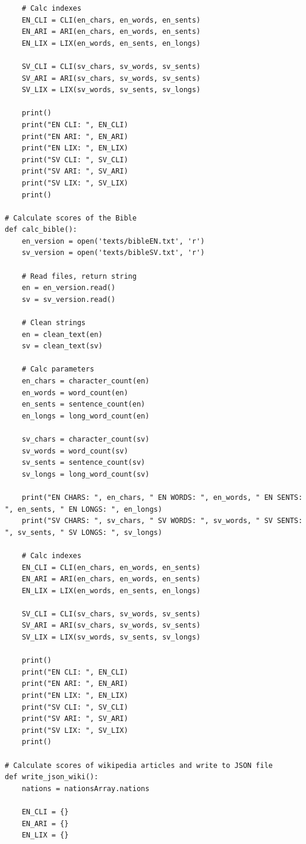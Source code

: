 \documentclass[a4paper]{article}
\begin{document}
\begin{verbatim}
    # Calc indexes
    EN_CLI = CLI(en_chars, en_words, en_sents)
    EN_ARI = ARI(en_chars, en_words, en_sents)
    EN_LIX = LIX(en_words, en_sents, en_longs)

    SV_CLI = CLI(sv_chars, sv_words, sv_sents)
    SV_ARI = ARI(sv_chars, sv_words, sv_sents)
    SV_LIX = LIX(sv_words, sv_sents, sv_longs)   
    
    print()
    print("EN CLI: ", EN_CLI)
    print("EN ARI: ", EN_ARI)
    print("EN LIX: ", EN_LIX)
    print("SV CLI: ", SV_CLI)
    print("SV ARI: ", SV_ARI)
    print("SV LIX: ", SV_LIX)
    print()

# Calculate scores of the Bible
def calc_bible():
    en_version = open('texts/bibleEN.txt', 'r')
    sv_version = open('texts/bibleSV.txt', 'r')
    
    # Read files, return string
    en = en_version.read()
    sv = sv_version.read()
    
    # Clean strings
    en = clean_text(en)
    sv = clean_text(sv)
    
    # Calc parameters
    en_chars = character_count(en)
    en_words = word_count(en)
    en_sents = sentence_count(en)
    en_longs = long_word_count(en)
        
    sv_chars = character_count(sv)
    sv_words = word_count(sv)
    sv_sents = sentence_count(sv)
    sv_longs = long_word_count(sv)    
    
    print("EN CHARS: ", en_chars, " EN WORDS: ", en_words, " EN SENTS: ", en_sents, " EN LONGS: ", en_longs)
    print("SV CHARS: ", sv_chars, " SV WORDS: ", sv_words, " SV SENTS: ", sv_sents, " SV LONGS: ", sv_longs)
        
    # Calc indexes
    EN_CLI = CLI(en_chars, en_words, en_sents)
    EN_ARI = ARI(en_chars, en_words, en_sents)
    EN_LIX = LIX(en_words, en_sents, en_longs)

    SV_CLI = CLI(sv_chars, sv_words, sv_sents)
    SV_ARI = ARI(sv_chars, sv_words, sv_sents)
    SV_LIX = LIX(sv_words, sv_sents, sv_longs)   
    
    print()
    print("EN CLI: ", EN_CLI)
    print("EN ARI: ", EN_ARI)
    print("EN LIX: ", EN_LIX)
    print("SV CLI: ", SV_CLI)
    print("SV ARI: ", SV_ARI)
    print("SV LIX: ", SV_LIX)
    print()   

# Calculate scores of wikipedia articles and write to JSON file   
def write_json_wiki():
    nations = nationsArray.nations
        
    EN_CLI = {}
    EN_ARI = {}
    EN_LIX = {}


\end{verbatim}
\end{document}
